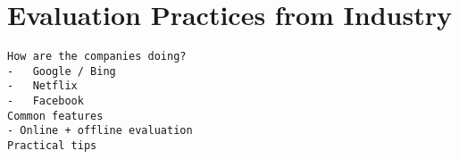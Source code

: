\documentclass[openany]{now} %
\begin{document}
\chapter{Evaluation Practices from Industry}

\begin{verbatim}
How are the companies doing?
-	Google / Bing
-	Netflix
-	Facebook
Common features
- Online + offline evaluation
Practical tips

\end{verbatim}

\cite{Gomez-Uribe2015}

\backmatter  %



\end{document}
